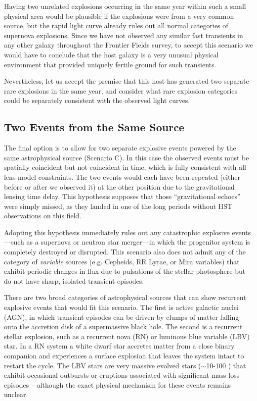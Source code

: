Having two unrelated explosions occurring in the same
year within such a small physical area would be plausible if the
explosions were from a very common source, but the rapid light curve
already rules out all normal categories of supernova explosions.
Since we have not observed any similar fast transients in any other
galaxy throughout the Frontier Fields survey, to accept this scenario
we would have to conclude that the \spock host galaxy is a very
unusual physical environment that provided uniquely fertile ground for
such transients.


Nevertheless, let us accept the premise that this host has generated
two separate rare explosions in the same year, and consider what rare
explosion categories could be separately consistent with the observed
light curves.


\subsection{Two Events from the Same Source}

The final option is to allow for two separate explosive events powered
by the same astrophysical source (Scenario C).  In this case the
observed events must be spatially coincident but not coincident in
time, which is fully consistent with all lens model constraints. The
two \spock events would each have been repeated (either before or
after we observed it) at the other position due to the gravitational
lensing time delay.  This hypothesis supposes that those
``gravitational echoes'' were simply missed, as they landed in one of
the long periods without HST observations on this field.

Adopting this hypothesis immediately rules out any catastrophic
explosive events---such as a supernova or neutron star merger---in
which the progenitor system is completely destroyed or disrupted. This
scenario also does not admit any of the category of {\it variable}
sources (e.g. Cepheids, RR Lyrae, or Mira variables) that exhibit
periodic changes in flux due to pulsations of the stellar photosphere
but do not have sharp, isolated transient episodes.

There are two broad categories of astrophysical sources that can show
recurrent explosive events that would fit this scenario.  The first is
active galactic nuclei (AGN), in which transient episodes can be
driven by clumps of matter falling onto the accretion disk of a
supermassive black hole.  The second is a recurrent stellar explosion,
such as a recurrent nova (RN) or luminous blue variable (LBV) star.
In a RN system a white dwarf star accretes matter from a close binary
companion and experiences a surface explosion that leaves the system
intact to restart the cycle.  The LBV stars are very massive evolved
stars ($\sim$10-100 \Msun) that exhibit occasional outbursts or
eruptions associated with significant mass loss episodes -- although
the exact physical mechanism for these events remains unclear.

